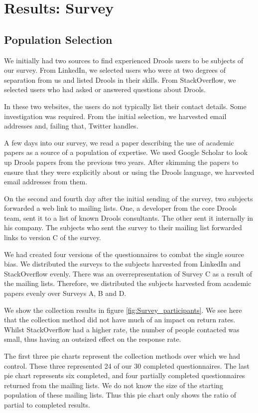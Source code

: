 \section{Results: Survey}
\label{section:Results_Survey}

\subsection{Population Selection}
We initially had two sources to find experienced Drools users to be subjects of our survey.
From LinkedIn, we selected users who were at two degrees of separation from us and listed Drools in their skills.
From StackOverflow, we selected users who had asked or answered questions about Drools.

In these two websites, the users do not typically list their contact details.
Some investigation was required.
From the initial selection, we harvested email addresses and, failing that, Twitter handles.

A few days into our survey, we read a paper describing the use of academic papers as a source of a population of expertise.
We used Google Scholar to look up Drools papers from the previous two years.
After skimming the papers to ensure that they were explicitly about or using the Drools language, we harvested email addresses from them.

On the second and fourth day after the initial sending of the survey, two subjects forwarded a web link to mailing lists.
One, a developer from the core Drools team, sent it to a list of known Drools consultants.
The other sent it internally in his company.
The subjects who sent the survey to their mailing list forwarded links to version C of the survey.

We had created four versions of the questionnaires to combat the single source bias.
We distributed the surveys to the subjects harvested from LinkedIn and StackOverflow evenly.
There was an overrepresentation of Survey C as a result of the mailing lists.
Therefore, we distributed the subjects harvested from academic papers evenly over Surveys A, B and D.

We show the collection results in figure \ref{fig:Survey_participants}.
We see here that the collection method did not have much of an impact on return rates.
Whilst StackOverflow had a higher rate, the number of people contacted was small, thus having an outsized effect on the response rate.

The first three pie charts represent the collection methods over which we had control.
These three represented 24 of our 30 completed questionnaires.
The last pie chart represents six completed, and four partially completed questionnaires returned from the mailing lists.
We do not know the size of the starting population of these mailing lists. 
Thus this pie chart only shows the ratio of partial to completed results.

